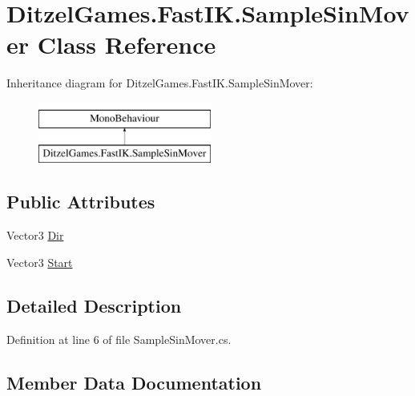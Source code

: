\hypertarget{class_ditzel_games_1_1_fast_i_k_1_1_sample_sin_mover}{}\section{Ditzel\+Games.\+Fast\+I\+K.\+Sample\+Sin\+Mover Class Reference}
\label{class_ditzel_games_1_1_fast_i_k_1_1_sample_sin_mover}
Inheritance diagram for Ditzel\+Games.\+Fast\+I\+K.\+Sample\+Sin\+Mover\+:\begin{figure}[H]
\begin{center}
\leavevmode
\includegraphics[height=2.000000cm]{class_ditzel_games_1_1_fast_i_k_1_1_sample_sin_mover}
\end{center}
\end{figure}
\subsection*{Public Attributes}
\begin{DoxyCompactItemize}
\item 
Vector3 \mbox{\hyperlink{class_ditzel_games_1_1_fast_i_k_1_1_sample_sin_mover_ae897465fd72443206a4687a98bbc7273}{Dir}}
\item 
Vector3 \mbox{\hyperlink{class_ditzel_games_1_1_fast_i_k_1_1_sample_sin_mover_abf720afbe44517fe8f1bbacd7e05e8d2}{Start}}
\end{DoxyCompactItemize}


\subsection{Detailed Description}


Definition at line 6 of file Sample\+Sin\+Mover.\+cs.



\subsection{Member Data Documentation}
\mbox{\label{class_ditzel_games_1_1_fast_i_k_1_1_sample_sin_mover_ae897465fd72443206a4687a98bbc7273}} 
